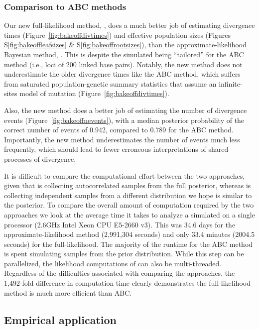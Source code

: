 \subsubsection{Comparison to ABC methods}

Our new full-likelihood method, \ecoevolity, does a much better job of
estimating divergence times
(Figure~\ref{fig:bakeoffdivtimes})
and effective population sizes
(Figures
S\ref{fig:bakeoffleafsizes}
\&
S\ref{fig:bakeoffrootsizes}),
than the approximate-likelihood Bayesian method, \dppmsbayes.
This is despite the simulated \datasets being ``tailored'' for the ABC method
(i.e., loci of 200 linked base pairs).
Notably, the new method does not underestimate the older divergence times like
the ABC method, which suffers from saturated population-genetic summary
statistics that assume an infinite-sites model of mutation
(Figure~\ref{fig:bakeoffdivtimes}).

Also, the new method does a better job of estimating the number of divergence
events (Figure~\ref{fig:bakeoffnevents}), with a median posterior probability
of the correct number of events of 0.942, compared to 0.789 for the ABC method.
Importantly, the new method underestimates the number of events much less
frequently,
which should lead to fewer erroneous interpretations of shared processes of
divergence.

It is difficult to compare the computational effort between the two approaches,
given that \ecoevolity is collecting autocorrelated samples from
the full posterior, whereas \dppmsbayes is collecting independent samples
from a different distribution we hope is similar to the posterior.
To compare the overall amount of computation required by the two approaches
we look at the average time it takes to analyze a simulated \dataset
on a single processor 
(2.6GHz Intel Xeon CPU E5-2660 v3).
This was 34.6 days for the approximate-likelihood method (2,991,304 seconds)
and only 33.4 minutes (2004.5 seconds) for the full-likelihood.
The majority of the runtime for the ABC method is spent simulating samples
from the prior distribution.
While this step can be parallelized, the likelihood computations of \ecoevolity
can also be multi-threaded.
Regardless of the difficulties associated with comparing the approaches, the
1,492-fold difference in computation time clearly demonstrates the
full-likelihood method is much more efficient than ABC.


\subsection{Empirical application}

